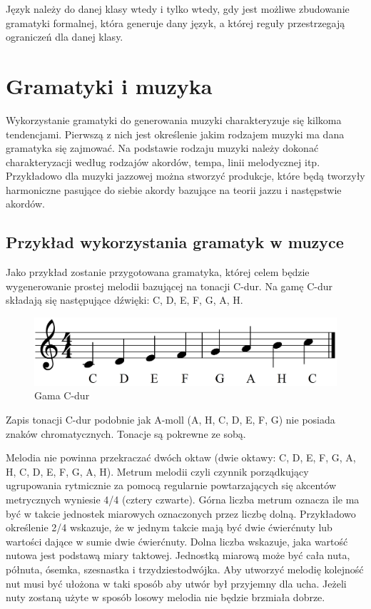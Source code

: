 \begin{definicja}
	Język należy do danej klasy wtedy i tylko wtedy, gdy jest możliwe zbudowanie gramatyki formalnej, która generuje dany język, a której reguły przestrzegają ograniczeń dla danej klasy.
\end{definicja}
 

\section{Gramatyki i muzyka}
Wykorzystanie gramatyki do generowania muzyki charakteryzuje się kilkoma tendencjami. Pierwszą z nich jest określenie jakim rodzajem muzyki ma dana gramatyka się zajmować. Na podstawie rodzaju muzyki należy dokonać charakteryzacji według rodzajów akordów, tempa, linii melodycznej itp. Przykładowo dla muzyki jazzowej można stworzyć produkcje, które będą tworzyły harmoniczne pasujące do siebie akordy bazujące na teorii jazzu i następstwie akordów. 

\subsection{Przykład wykorzystania gramatyk w muzyce}

Jako przykład zostanie przygotowana gramatyka, której celem będzie wygenerowanie prostej melodii bazującej na tonacji C-dur. Na gamę C-dur składają się następujące dźwięki: C, D, E, F, G, A, H. 

\begin{figure}[H]
	\centering
	\includegraphics[width=0.7\linewidth]{c_dur}
	\caption[]{Gama C-dur}
 
	\label{fig:cdur}
\end{figure}

Zapis tonacji C-dur podobnie jak A-moll (A, H, C, D, E, F, G) nie posiada znaków chromatycznych. Tonacje są pokrewne ze sobą. 

Melodia nie powinna przekraczać dwóch oktaw (dwie oktawy: C, D, E, F, G, A, H, C, D, E, F, G, A, H). Metrum melodii czyli czynnik porządkujący ugrupowania rytmicznie za pomocą regularnie powtarzających się akcentów metrycznych wyniesie 4/4 (cztery czwarte). Górna liczba metrum oznacza ile ma być w takcie jednostek miarowych oznaczonych przez liczbę dolną. Przykładowo określenie 2/4 wskazuje, że w jednym takcie mają być dwie ćwierćnuty lub wartości dające w sumie dwie ćwierćnuty. Dolna liczba wskazuje, jaka wartość nutowa jest podstawą miary taktowej. Jednostką miarową może być cała nuta, półnuta, ósemka, szesnastka i trzydziestodwójka. Aby utworzyć melodię kolejność nut musi być ułożona w taki sposób aby utwór był przyjemny dla ucha. Jeżeli nuty zostaną użyte w sposób losowy melodia nie będzie brzmiała dobrze.

